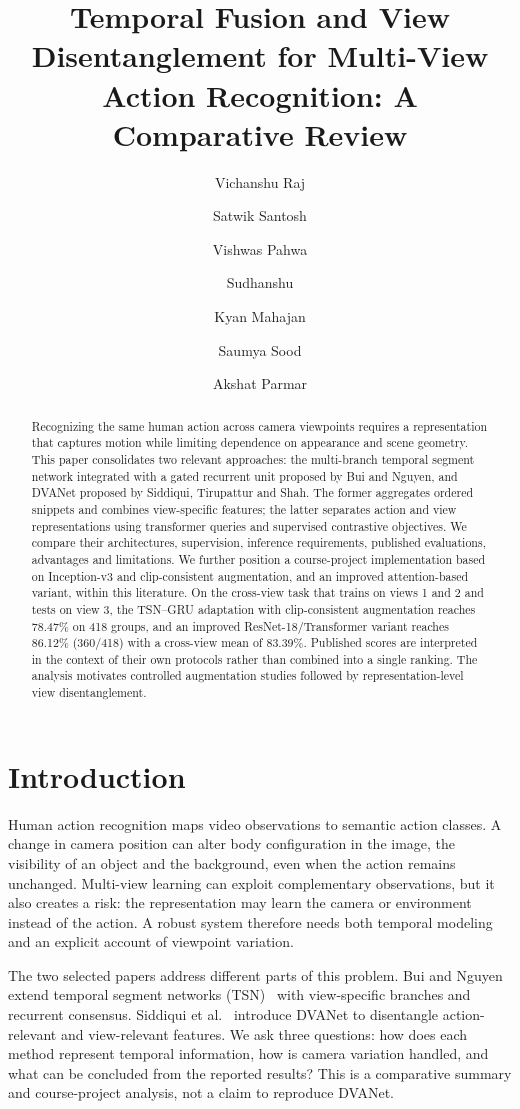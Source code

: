 \documentclass[runningheads]{llncs}
\title{Temporal Fusion and View Disentanglement for Multi-View Action Recognition: A Comparative Review}
\author{Vichanshu Raj \and Satwik Santosh \and Vishwas Pahwa \and Sudhanshu \and Kyan Mahajan \and Saumya Sood \and Akshat Parmar}
\institute{Indian Institute of Information Technology, Allahabad, India\\
\email{iit2024083@iiita.ac.in, iit2024084@iiita.ac.in, iit2024087@iiita.ac.in, iit2024081@iiita.ac.in, iit2024092@iiita.ac.in, iit2024018@iiita.ac.in, iit2024077@iiita.ac.in}}
\begin{document}
\maketitle

\begin{abstract}
Recognizing the same human action across camera viewpoints requires a representation that captures motion while limiting dependence on appearance and scene geometry. This paper consolidates two relevant approaches: the multi-branch temporal segment network integrated with a gated recurrent unit proposed by Bui and Nguyen, and DVANet proposed by Siddiqui, Tirupattur and Shah. The former aggregates ordered snippets and combines view-specific features; the latter separates action and view representations using transformer queries and supervised contrastive objectives. We compare their architectures, supervision, inference requirements, published evaluations, advantages and limitations. We further position a course-project implementation based on Inception-v3 and clip-consistent augmentation, and an improved attention-based variant, within this literature. On the cross-view task that trains on views 1 and 2 and tests on view 3, the TSN--GRU adaptation with clip-consistent augmentation reaches 78.47\% on 418 groups, and an improved ResNet-18/Transformer variant reaches 86.12\% (360/418) with a cross-view mean of 83.39\%. Published scores are interpreted in the context of their own protocols rather than combined into a single ranking. The analysis motivates controlled augmentation studies followed by representation-level view disentanglement.
\end{abstract}

\section{Introduction}
Human action recognition maps video observations to semantic action classes. A change in camera position can alter body configuration in the image, the visibility of an object and the background, even when the action remains unchanged. Multi-view learning can exploit complementary observations, but it also creates a risk: the representation may learn the camera or environment instead of the action. A robust system therefore needs both temporal modeling and an explicit account of viewpoint variation.

The two selected papers address different parts of this problem. Bui and Nguyen~\cite{bui} extend temporal segment networks (TSN)~\cite{tsn} with view-specific branches and recurrent consensus. Siddiqui et al.~\cite{dva} introduce DVANet to disentangle action-relevant and view-relevant features. We ask three questions: how does each method represent temporal information, how is camera variation handled, and what can be concluded from the reported results? This is a comparative summary and course-project analysis, not a claim to reproduce DVANet.
\end{document}
